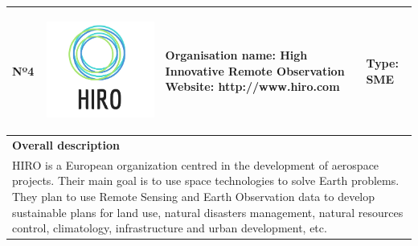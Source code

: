 \begin{longtable}[H]{|p{0.7cm}|p{4cm}|p{7cm}|p{1.3cm}|}
	\hline
	\begin{center} Nº4 \end{center} & \begin{center} \includegraphics[scale=0.07]{./logos/logo} \end{center} & \begin{center} \textbf{Organisation name:} High Innovative Remote Observation \newline \textbf{Website:} http://www.hiro.com \end{center} & \begin{center} Type: \newline SME \end{center} \\ \hline
	
	\multicolumn{4}{|p{13cm}|}{\textbf{Overall description}}  \\ \hline
	
	\multicolumn{4}{|p{14.5cm}|}{HIRO is a European organization centred in the development of aerospace projects. Their main goal is to use space technologies to solve Earth problems. They plan to use Remote Sensing and Earth Observation data to develop sustainable plans for land use, natural disasters management, natural resources control, climatology, infrastructure and urban development, etc.}  \\ \hline
	

\end{longtable}
